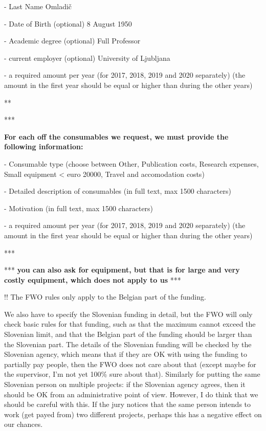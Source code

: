 \documentclass[11pt,dvipsnames,usenames,a4paper]{article}
\begin{document}
- Last Name
Omladič

- Date of Birth (optional)
8 August 1950

- Academic degree (optional)
Full Professor

- current employer (optional)
University of Ljubljana

- a required amount per year (for 2017, 2018, 2019 and 2020 separately) (the amount in the first year should be equal or higher than during the other years)

** 

*** {\bf\color{blue}For each off the consumables we request, we must provide the following information:

- Consumable type (choose between Other, Publication costs, Research expenses, Small equipment < euro 20000, Travel and accomodation costs)

- Detailed description of consumables (in full text, max 1500 characters)

- Motivation (in full text, max 1500 characters)

- a required amount per year (for 2017, 2018, 2019 and 2020 separately) (the amount in the first year should be equal or higher than during the other years)

} ***

*** {\bf\color{blue} you can also ask for equipment, but that is for large and very costly equipment, which does not apply to us} ***

!! The FWO rules only apply to the Belgian part of the funding.

We also have to specify the Slovenian funding in detail, but the FWO will only check basic rules for that funding, such as that the maximum cannot exceed the Slovenian limit, and that the Belgian part of the funding should be larger than the Slovenian part. The details of the Slovenian funding will be checked by the Slovenian agency, which means that if they are OK with using the funding to partially pay people, then the FWO does not care about that (except maybe for the supervisor, I'm not yet 100\% sure about that). Similarly for putting the same Slovenian person on multiple projects: if the Slovenian agency agrees, then it should be OK from an administrative point of view. However, I do think that we should be careful with this. If the jury notices that the same person intends to work (get payed from) two different projects, perhaps this has a negative effect on our chances.
\end{document}
